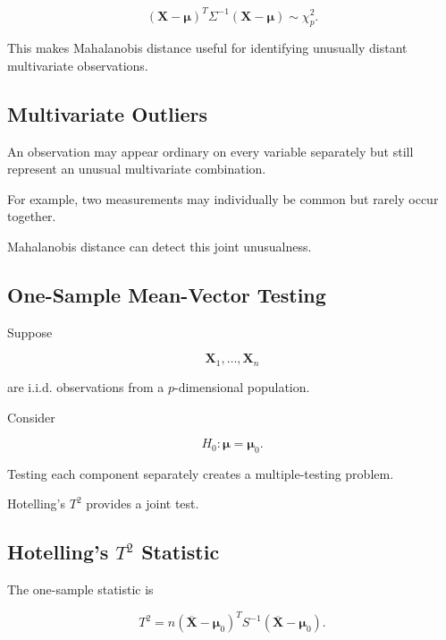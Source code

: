 \[
\boxed{
(
\mathbf{X}-\boldsymbol{\mu}
)^T
\Sigma^{-1}
(
\mathbf{X}-\boldsymbol{\mu}
)
\sim
\chi^2_p.
}
\]

This makes Mahalanobis distance useful for identifying unusually distant
multivariate observations.

\subsection{Multivariate Outliers}
\label{subsec:multivariate-outliers}

An observation may appear ordinary on every variable separately but
still represent an unusual multivariate combination.

For example, two measurements may individually be common but rarely occur
together.

Mahalanobis distance can detect this joint unusualness.

\subsection{One-Sample Mean-Vector Testing}
\label{subsec:one-sample-mean-vector-testing}

Suppose

\[
\mathbf{X}_1,\ldots,\mathbf{X}_n
\]

are i.i.d. observations from a \(p\)-dimensional population.

Consider

\[
\boxed{
H_0:
\boldsymbol{\mu}
=
\boldsymbol{\mu}_0.
}
\]

Testing each component separately creates a multiple-testing problem.

Hotelling's \(T^2\) provides a joint test.

\subsection{Hotelling's \(T^2\) Statistic}
\label{subsec:hotelling-t-squared}

The one-sample statistic is

\[
\boxed{
T^2
=
n
(
\overline{\mathbf{X}}
-
\boldsymbol{\mu}_0
)^T
S^{-1}
(
\overline{\mathbf{X}}
-
\boldsymbol{\mu}_0
).
}
\]

